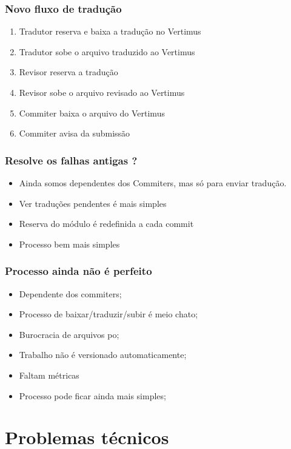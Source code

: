 \documentclass{beamer}
\begin{document}
\begin{frame}
    \frametitle[Vertimus]{Novo fluxo de tradução}
    \begin{enumerate}[<+->]
        \item Tradutor reserva e baixa a tradução no Vertimus
        \item Tradutor sobe o arquivo traduzido ao Vertimus
        \item Revisor reserva a tradução
        \item Revisor sobe o arquivo revisado ao Vertimus
        \item Commiter baixa o arquivo do Vertimus
        \item Commiter avisa da submissão
    \end{enumerate}
\end{frame}

\begin{frame}
    \frametitle{Resolve os falhas antigas ?}
    \begin{itemize}[<+->]
        \item Ainda somos dependentes dos Commiters, mas só para enviar tradução.
        \item Ver traduções pendentes é mais simples
        \item Reserva do módulo é redefinida a cada commit
        \item Processo bem mais simples
    \end{itemize}
\end{frame}

\begin{frame}
    \frametitle{Processo ainda não é perfeito }
    \begin{itemize}[<+->]
        \item Dependente dos commiters;
        \item Processo de baixar/traduzir/subir é meio chato;
        \item Burocracia de arquivos po;
        \item Trabalho não é versionado automaticamente;
        \item Faltam métricas
        \item Processo pode ficar ainda mais simples;
    \end{itemize}
\end{frame}

\section{Problemas técnicos}
\end{document}
